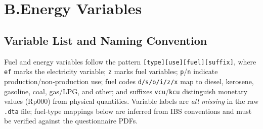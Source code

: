\documentclass[11pt, a4paper]{article}
\begin{document}
\section{B.\;Energy Variables}

\subsection{Variable List and Naming Convention}

Fuel and energy variables follow the pattern \texttt{[type][use][fuel][suffix]}, where
\texttt{ef} marks the electricity variable; \texttt{z} marks fuel variables;
\texttt{p}/\texttt{n} indicate production/non-production use;
fuel codes \texttt{d/s/o/i/z/x} map to diesel, kerosene, gasoline, coal, gas/LPG, and other;
and suffixes \texttt{vcu}/\texttt{kcu} distinguish monetary values (Rp000) from physical
quantities. Variable labels are \textit{all missing} in the raw \texttt{.dta} file;
fuel-type mappings below are inferred from IBS conventions and must be verified against the
questionnaire PDFs.
\end{document}
